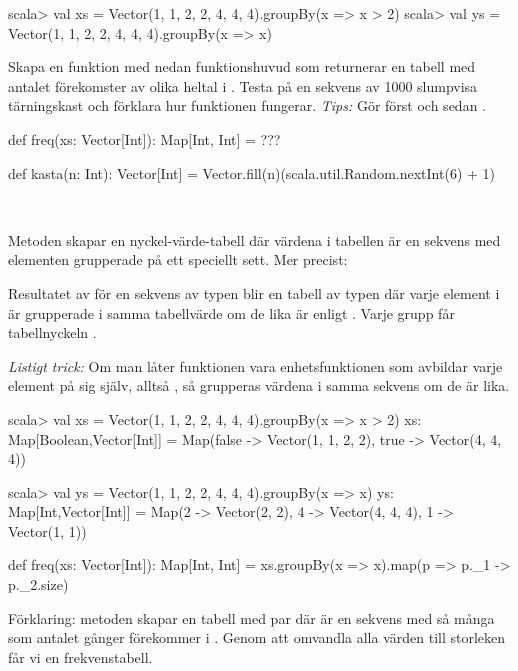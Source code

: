 \begin{REPL}
scala> val xs = Vector(1, 1, 2, 2, 4, 4, 4).groupBy(x => x > 2)
scala> val ys = Vector(1, 1, 2, 2, 4, 4, 4).groupBy(x => x)
\end{REPL}

\Subtask Skapa en funktion  med nedan funktionshuvud som returnerar en tabell med antalet förekomster av olika heltal i . Testa  på en sekvens av 1000 slumpvisa tärningskast och förklara hur funktionen  fungerar. \emph{Tips:} Gör först  och sedan .

\begin{Code}
def freq(xs: Vector[Int]): Map[Int, Int] = ???

def kasta(n: Int): Vector[Int] =
  Vector.fill(n)(scala.util.Random.nextInt(6) + 1)
\end{Code}

\SOLUTION

\TaskSolved \what~

\SubtaskSolved Metoden  skapar en nyckel-värde-tabell där värdena i tabellen är en sekvens med elementen grupperade på ett speciellt sett.
Mer precist:

Resultatet av  för en sekvens  av typen  blir en tabell av typen  där varje element  i  är grupperade i samma tabellvärde om de lika är enligt . Varje grupp får tabellnyckeln .

\emph{Listigt trick:} Om man låter funktionen  vara enhetsfunktionen som avbildar varje element på sig själv, alltså , så grupperas värdena i samma sekvens om de är lika.

\begin{REPL}
scala> val xs = Vector(1, 1, 2, 2, 4, 4, 4).groupBy(x => x > 2)
xs: Map[Boolean,Vector[Int]] =
  Map(false -> Vector(1, 1, 2, 2), true -> Vector(4, 4, 4))

scala> val ys = Vector(1, 1, 2, 2, 4, 4, 4).groupBy(x => x)
ys: Map[Int,Vector[Int]] =
  Map(2 -> Vector(2, 2), 4 -> Vector(4, 4, 4), 1 -> Vector(1, 1))
\end{REPL}


\SubtaskSolved

\begin{Code}
def freq(xs: Vector[Int]): Map[Int, Int] =
  xs.groupBy(x => x).map(p => p._1 -> p._2.size)
\end{Code}
Förklaring: metoden  skapar en tabell med par  där  är en sekvens med så många  som antalet gånger  förekommer i . Genom att omvandla alla värden  till storleken  får vi en frekvenstabell.

